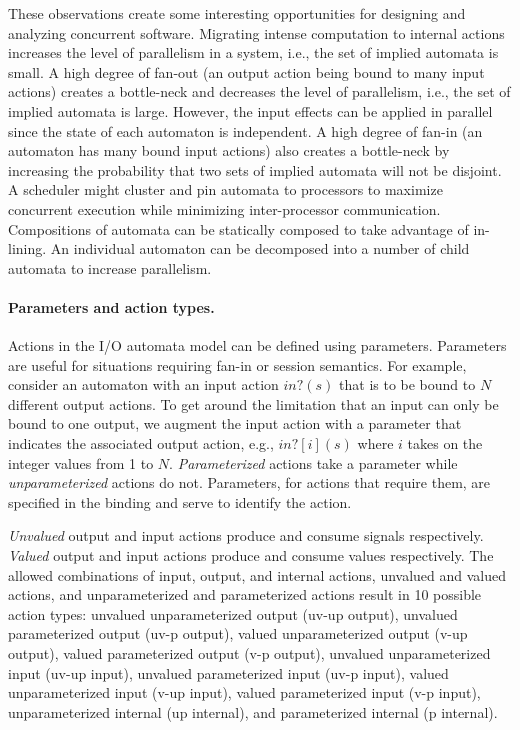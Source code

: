 \ifjournal
These observations create some interesting opportunities for designing and analyzing concurrent software.
Migrating intense computation to internal actions increases the level of parallelism in a system, i.e., the set of implied automata is small.
A high degree of fan-out (an output action being bound to many input actions) creates a bottle-neck and decreases the level of parallelism, i.e., the set of implied automata is large.
However, the input effects can be applied in parallel since the state of each automaton is independent.
A high degree of fan-in (an automaton has many bound input actions) also creates a bottle-neck by increasing the probability that two sets of implied automata will not be disjoint.
A scheduler might cluster and pin automata to processors to maximize concurrent execution while minimizing inter-processor communication.
Compositions of automata can be statically composed to take advantage of in-lining.
An individual automaton can be decomposed into a number of child automata to increase parallelism.

\paragraph*{Parameters and action types.}
Actions in the I/O automata model can be defined using parameters.
Parameters are useful for situations requiring fan-in or session semantics.
For example, consider an automaton with an input action $in?(s)$ that is to be bound to $N$ different output actions.
To get around the limitation that an input can only be bound to one output, we augment the input action with a parameter that indicates the associated output action, e.g., $in?[i](s)$ where $i$ takes on the integer values from 1 to $N$.
\emph{Parameterized} actions take a parameter while \emph{unparameterized} actions do not.
Parameters, for actions that require them, are specified in the binding and serve to identify the action.

\emph{Unvalued} output and input actions produce and consume signals respectively.
\emph{Valued} output and input actions produce and consume values respectively.
The allowed combinations of input, output, and internal actions, unvalued and valued actions, and unparameterized and parameterized actions result in 10 possible action types:
unvalued unparameterized output (uv-up output),
unvalued parameterized output (uv-p output),
valued unparameterized output (v-up output),
valued parameterized output (v-p output),
unvalued unparameterized input (uv-up input),
unvalued parameterized input (uv-p input),
valued unparameterized input (v-up input),
valued parameterized input (v-p input),
unparameterized internal (up internal), and
parameterized internal (p internal).

